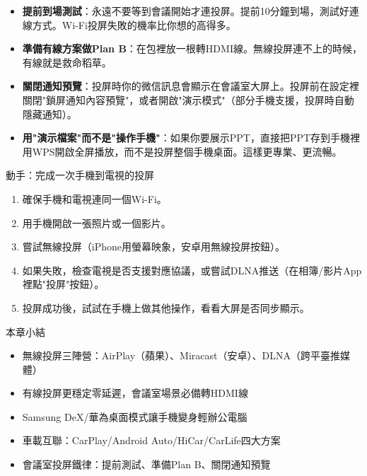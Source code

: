\begin{itemize}
  \item \textbf{提前到場測試}：永遠不要等到會議開始才連投屏。提前10分鐘到場，測試好連線方式。Wi-Fi投屏失敗的機率比你想的高得多。
  \item \textbf{準備有線方案做Plan B}：在包裡放一根轉HDMI線。無線投屏連不上的時候，有線就是救命稻草。
  \item \textbf{關閉通知預覽}：投屏時你的微信訊息會顯示在會議室大屏上。投屏前在設定裡關閉"鎖屏通知內容預覽"，或者開啟"演示模式"（部分手機支援，投屏時自動隱藏通知）。
  \item \textbf{用"演示檔案"而不是"操作手機"}：如果你要展示PPT，直接把PPT存到手機裡用WPS開啟全屏播放，而不是投屏整個手機桌面。這樣更專業、更流暢。
\end{itemize}

\begin{tcbpractice}{動手：完成一次手機到電視的投屏}
\begin{enumerate}
  \item 確保手機和電視連同一個Wi-Fi。
  \item 用手機開啟一張照片或一個影片。
  \item 嘗試無線投屏（iPhone用螢幕映象，安卓用無線投屏按鈕）。
  \item 如果失敗，檢查電視是否支援對應協議，或嘗試DLNA推送（在相簿/影片App裡點"投屏"按鈕）。
  \item 投屏成功後，試試在手機上做其他操作，看看大屏是否同步顯示。
\end{enumerate}

\end{tcbpractice}

\begin{tcbsummary}{本章小結}
\begin{itemize}
  \item 無線投屏三陣營：AirPlay（蘋果）、Miracast（安卓）、DLNA（跨平臺推媒體）
  \item 有線投屏更穩定零延遲，會議室場景必備轉HDMI線
  \item Samsung DeX/華為桌面模式讓手機變身輕辦公電腦
  \item 車載互聯：CarPlay/Android Auto/HiCar/CarLife四大方案
  \item 會議室投屏鐵律：提前測試、準備Plan B、關閉通知預覽
\end{itemize}

\end{tcbsummary}
